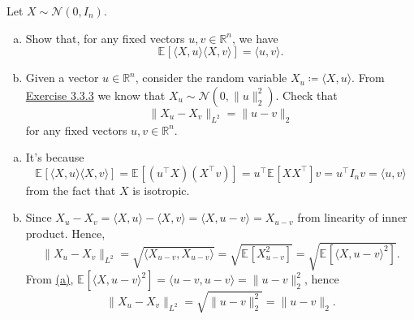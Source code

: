\begin{problem*}[Exercise 3.3.5]\label{ex3.3.5}
	Let \(X \sim \mathcal{N} (0, I_n)\).
	\begin{enumerate}[(a)]
		\item\label{ex3.3.5:a} Show that, for any fixed vectors \(u, v \in \mathbb{R} ^n\), we have
		      \[
			      \mathbb{E}_{}[\langle X, u \rangle \langle X, v \rangle ]
			      = \langle u, v \rangle .
		      \]
		\item\label{ex3.3.5:b} Given a vector \(u \in \mathbb{R} ^n\), consider the random variable \(X_u \coloneqq \langle X, u \rangle \). From \hyperref[ex3.3.3]{Exercise 3.3.3} we know that \(X_u \sim \mathcal{N} (0, \lVert u \rVert _2^2)\). Check that
		      \[
			      \lVert X_u - X_v \rVert _{L^2}
			      = \lVert u - v \rVert _2
		      \]
		      for any fixed vectors \(u, v \in \mathbb{R} ^n\).
	\end{enumerate}
\end{problem*}
\begin{answer}
	\begin{enumerate}[(a)]
		\item It's because
		      \[
			      \mathbb{E}_{}[\langle X, u \rangle \langle X, v \rangle ]
			      = \mathbb{E}_{}[(u ^{\top} X) (X^{\top} v)]
			      = u^{\top} \mathbb{E}_{}[X X^{\top} ] v
			      = u^{\top} I_n v
			      = \langle u, v \rangle
		      \]
		      from the fact that \(X\) is isotropic.
		\item Since \(X_u - X_v = \langle X, u \rangle - \langle X, v \rangle = \langle X, u-v \rangle = X_{u-v}\) from linearity of inner product. Hence,
		      \[
			      \lVert X_u - X_v \rVert _{L^2}
			      = \sqrt{\langle X_{u-v}, X_{u-v} \rangle }
			      = \sqrt{\mathbb{E}_{}[X_{u-v} ^2] }
			      = \sqrt{\mathbb{E}_{}[\langle X, u-v \rangle ^2] }.
		      \]
		      From \hyperref[ex3.3.5:a]{(a)}, \(\mathbb{E}_{}[\langle X, u-v \rangle ^2] = \langle u-v, u-v \rangle = \lVert u-v \rVert _2^2\), hence \
		      \[
			      \lVert X_u - X_v \rVert _{L^2} = \sqrt{\lVert u-v \rVert _2^2} = \lVert u-v \rVert _2.
		      \]
	\end{enumerate}
\end{answer}

